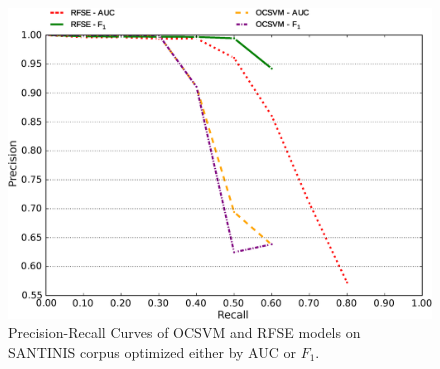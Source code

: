 \begin{figure}[t]
\begin{center}
\includegraphics[scale=0.45]{Figures/MacroPRC11AVG_RFSE_OCSVME_SANTINIS_2.eps}
\caption{Precision-Recall Curves of OCSVM and RFSE models on SANTINIS corpus optimized either by AUC or $F_{1}$.}\label{chap:noise:fig:MacroPRC_RFSE_OCSVME_SANTINIS}
\end{center}
\end{figure}

%



